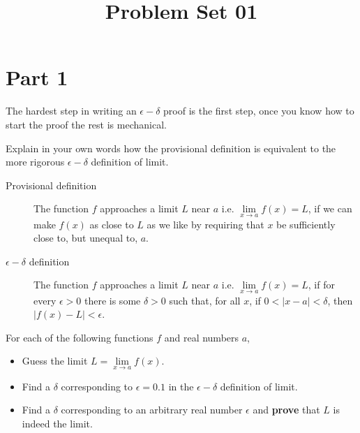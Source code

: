 \documentclass[9pt, a4paper, oneside]{amsart}
\title{Problem Set 01}
\begin{document}
\maketitle
\thispagestyle{fancy}


\section*{Part 1}

The hardest step in writing an $ \epsilon-\delta$ proof is the first step, once you know how to start the proof the rest is mechanical. \\

\begin{questions}

	\item Explain in your own words how the provisional definition is equivalent to the more rigorous $\epsilon-\delta$ definition of limit.

	\begin{description}
		\item[Provisional definition] The function $f$ approaches a limit $L$ near $a$ i.e. $\lim \limits _ {x \rightarrow a} f(x) = L$, if we can make $f(x)$ as close to $L$ as we like by requiring that $x$ be sufficiently close to, but unequal to, $a$.
		\item[$\epsilon-\delta$ definition] The function $f$ {approaches a limit} $L$ near $a$ i.e. $\lim \limits _ {x \rightarrow a} f(x) = L$, if for every $\epsilon > 0$ there is some $\delta > 0$ such that, for all $x$, if $0 < |x - a| < \delta$, then $|f(x) - L| < \epsilon$.
	\end{description}

	\item For each of the following functions $f$ and real numbers $a$,
	\begin{itemize}
		\item Guess the limit $L = \lim \limits _ {x \rightarrow a} f(x)$.
		\item Find a $\delta$ corresponding to $\epsilon = 0.1$ in the $\epsilon - \delta$ definition of limit.
		\item Find a $\delta$ corresponding to an arbitrary real number $\epsilon$ and \textbf{prove} that $L$ is indeed the limit.


\end{itemize}
\end{questions}
\end{document}
